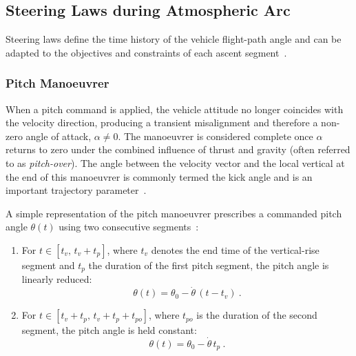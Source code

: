 
\subsection{Steering Laws during Atmospheric Arc}

Steering laws define the time history of the vehicle flight-path angle and can be adapted to the objectives and constraints of each ascent segment~\cite{Ulrich}.


\subsubsection{Pitch Manoeuvrer}

When a pitch command is applied, the vehicle attitude no longer coincides with the velocity direction, producing a transient misalignment and therefore a non-zero angle of attack, $\alpha \neq 0$. The manoeuvrer is considered complete once $\alpha$ returns to zero under the combined influence of thrust and gravity (often referred to as \emph{pitch-over}). The angle between the velocity vector and the local vertical at the end of this manoeuvrer is commonly termed the kick angle and is an important trajectory parameter~\cite{teofilatto2025trajectories}.

A simple representation of the pitch manoeuvrer prescribes a commanded pitch angle $\theta(t)$ using two consecutive segments~\cite{teofilatto2025trajectories}:
\begin{enumerate}
  \item For $t \in [t_v,\, t_v+t_p]$, where $t_v$ denotes the end time of the vertical-rise segment and $t_p$ the duration of the first pitch segment, the pitch angle is linearly reduced:
  \begin{equation}
  \theta(t)=\theta_0-\dot{\theta}\,(t-t_v) \ .
  \end{equation}

  \item For $t \in [t_v+t_p,\, t_v+t_p+t_{po}]$, where $t_{po}$ is the duration of the second segment, the pitch angle is held constant:
  \begin{equation}
  \theta(t)=\theta_0-\dot{\theta}\,t_p \ .
  \end{equation}
\end{enumerate}

